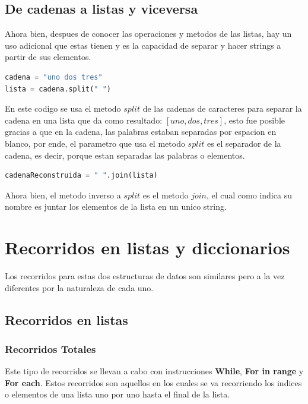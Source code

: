 \documentclass{article}
\begin{document}
\subsection{De cadenas a listas y viceversa}
Ahora bien, despues de conocer las operaciones y metodos de las listas, hay un uso adicional que estas tienen y es la capacidad de separar y hacer strings a partir de sus elementos.
\begin{lstlisting}[language=Python, caption= Metodo Split de cadena a lista]
cadena = "uno dos tres"
lista = cadena.split(" ")
\end{lstlisting}
En este codigo se usa el metodo \(split\) de las cadenas de caracteres para separar la cadena en una lista que da como resultado: \([uno,dos,tres]\), esto fue posible gracias a que en la cadena, las palabras estaban separadas por espacion en blanco, por ende, el parametro que usa el metodo \(split\) es el separador de la cadena, es decir, porque estan separadas las palabras o elementos.
\begin{lstlisting}[language=Python, caption= Metodo Join de Lista a cadena]
cadenaReconstruida = " ".join(lista)
\end{lstlisting}
Ahora bien, el metodo inverso a \(split\) es el metodo \(join\), el cual como indica su nombre es juntar los elementos de la lista en un unico string.
\section{Recorridos en listas y diccionarios}
Los recorridos para estas dos estructuras de datos son similares pero a la vez diferentes por la naturaleza de cada uno.
\subsection{Recorridos en listas}
\subsubsection{Recorridos Totales}
Este tipo de recorridos se llevan a cabo con instrucciones \textbf{While}, \textbf{For in range} y \textbf{For each}. Estos recorridos son aquellos en los cuales se va recorriendo los indices o elementos de una lista uno por uno hasta el final de la lista.
\end{document}
